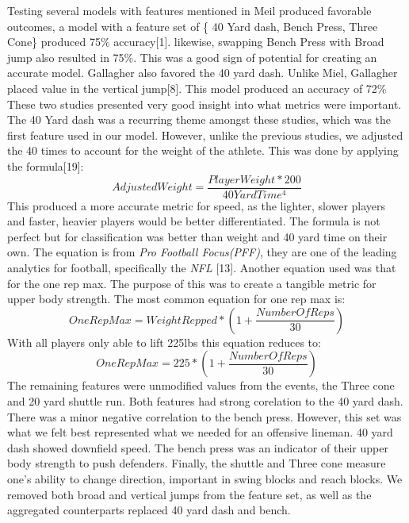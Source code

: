 \documentclass[confrence]{IEEEtran}
\begin{document}
Testing several models with features mentioned in Meil produced favorable outcomes, a model with a feature set of \{
40 Yard dash, Bench Press, Three Cone\} produced 75\% accuracy[1]. likewise, swapping Bench Press with Broad jump also resulted in 75\%.
This was a good sign of potential for creating an accurate model.
Gallagher also favored the 40 yard dash. Unlike Miel, Gallagher placed value in the vertical jump[8]. This model produced an accuracy of 72\%
These two studies presented very good insight into what metrics were important.
The 40 Yard dash was a recurring theme amongst these studies, which was the first feature used in our model.
However, unlike the previous studies, we adjusted the 40 times to account for the weight of the athlete. This was done by applying the formula[19]:
\[
    AdjustedWeight = \frac{PlayerWeight*200}{40YardTime^4}
\]
This produced a more accurate metric for speed, as the lighter, slower players and faster, heavier players would be better differentiated.
The formula is not perfect but for classification was better than weight and 40 yard time on their own.
The equation is from \textit{Pro Football Focus(PFF)}, they are one of the leading analytics for football, specifically the \textit{NFL} [13].
Another equation used was that for the one rep max. The purpose of this was to create a tangible metric for upper body strength.
The most common equation for one rep max is:
\[
    OneRepMax = WeightRepped*(1+\frac{NumberOfReps}{30})
\]
With all players only able to lift 225lbs this equation reduces to:
\[
    OneRepMax = 225*(1+\frac{NumberOfReps}{30})
\]
The remaining features were unmodified values from the events, the Three cone and 20 yard shuttle run.
Both features had strong corelation to the 40 yard dash. There was a minor negative correlation to the bench press.
However, this set was what we felt best represented what we needed for an offensive lineman.
40 yard dash showed downfield speed. The bench press was an indicator of their upper body strength to push defenders. Finally, the shuttle and Three cone measure one's ability to change direction, important in swing blocks and reach blocks.
We removed both broad and vertical jumps from the feature set, as well as the aggregated counterparts replaced 40 yard dash and bench.
\end{document}
